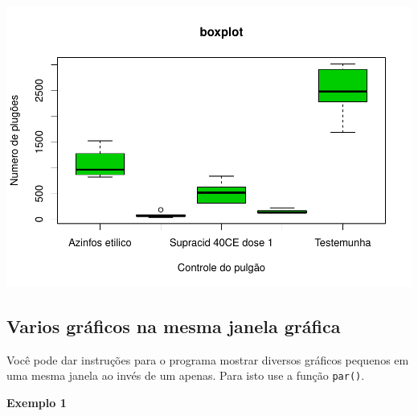 \documentclass[
]{book}
\newenvironment{Shaded}{\begin{snugshade}}{\end{snugshade}}
\newcommand{\CommentTok}[1]{\textcolor[rgb]{0.56,0.35,0.01}{\textit{#1}}}
\newcommand{\DataTypeTok}[1]{\textcolor[rgb]{0.13,0.29,0.53}{#1}}
\newcommand{\DecValTok}[1]{\textcolor[rgb]{0.00,0.00,0.81}{#1}}
\newcommand{\KeywordTok}[1]{\textcolor[rgb]{0.13,0.29,0.53}{\textbf{#1}}}
\newcommand{\NormalTok}[1]{#1}
\newcommand{\OperatorTok}[1]{\textcolor[rgb]{0.81,0.36,0.00}{\textbf{#1}}}
\begin{document}
\includegraphics{TudodoR_files/figure-latex/unnamed-chunk-179-1.pdf}

\hypertarget{varios-gruxe1ficos-na-mesma-janela-gruxe1fica}{%
\subsection{Varios gráficos na mesma janela gráfica}\label{varios-gruxe1ficos-na-mesma-janela-gruxe1fica}}

Você pode dar instruções para o programa mostrar diversos gráficos pequenos em uma mesma janela ao invés de um apenas. Para isto use a função \texttt{par()}.

\textbf{Exemplo 1}

\begin{Shaded}
\end{Shaded}
\end{document}
